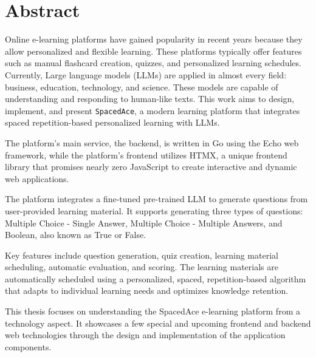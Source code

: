 \vfill
\selectenglish


\chapter*{Abstract}

Online e-learning platforms have gained popularity in recent years because they allow personalized and flexible learning. These platforms typically offer features such as manual flashcard creation, quizzes, and personalized learning schedules. Currently, Large language models (LLMs) are applied in almost every field: business, education, technology, and science. These models are capable of understanding and responding to human-like texts. This work aims to design, implement, and present \texttt{SpacedAce}, a modern learning platform that integrates spaced repetition-based personalized learning with LLMs.

The platform's main service, the backend, is written in Go using the Echo web framework, while the platform's frontend utilizes HTMX, a unique frontend library that promises nearly zero JavaScript to create interactive and dynamic web applications.

The platform integrates a fine-tuned pre-trained LLM to generate questions from user-provided learning material. It supports generating three types of questions: Multiple Choice - Single Answer, Multiple Choice - Multiple Answers, and Boolean, also known as True or False.

Key features include question generation, quiz creation, learning material scheduling, automatic evaluation, and scoring. The learning materials are automatically scheduled using a personalized, spaced, repetition-based algorithm that adapts to individual learning needs and optimizes knowledge retention.

This thesis focuses on understanding the SpacedAce e-learning platform from a technology aspect. It showcases a few special and upcoming frontend and backend web technologies through the design and implementation of the application components.

\vfill
\selectthesislanguage

\setcounter{romanPage}{\value{page}}
